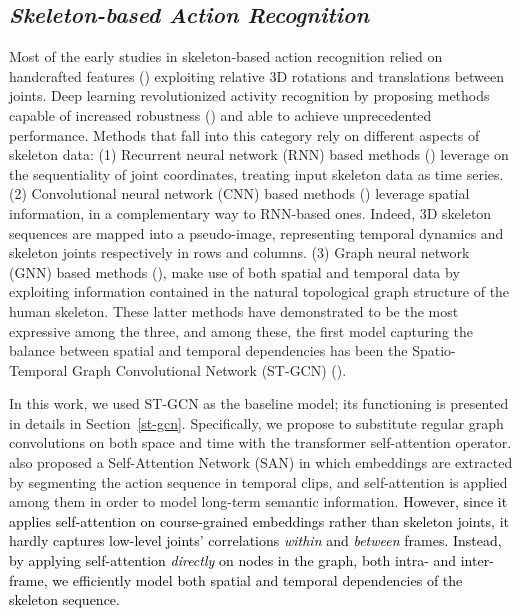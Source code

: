 \documentclass[times,twocolumn,final,authoryear]{elsarticle}
\DeclareRobustCommand{\new}[1]
{{\textcolor{black}{#1}}}
\begin{document}
\subsection{\textit{Skeleton-based Action Recognition}}{Most of the early studies in skeleton-based action recognition relied on handcrafted features (\cite{jointly,points,locations}) exploiting relative 3D rotations and translations between joints. Deep learning revolutionized activity recognition by proposing methods capable of increased robustness (\cite{a-comparative}) and able to achieve unprecedented performance. Methods that fall into this category rely on different aspects of skeleton data: (1) Recurrent neural network (RNN) based methods (\cite{Rnn,modeling,global-context,hrnn}) leverage on the sequentiality of joint coordinates, treating input skeleton data as time series. (2) Convolutional neural network (CNN) based methods (\cite{p-cnn,2s-cnn,investigation,liu2017enhanced,bo}) leverage spatial information, in a complementary way to RNN-based ones. Indeed, 3D skeleton sequences are mapped into a pseudo-image, representing temporal dynamics and skeleton joints respectively in rows and columns. (3) Graph neural network (GNN) based methods (\cite{yan2018spatial,li2019actional,Shi2018TwoStreamAG,dirgraph,shift,disent}), make use of both spatial and temporal data by exploiting information contained in the natural topological graph structure of the human skeleton. These latter methods have demonstrated to be the most expressive among the three, and among these, the first model capturing the balance between spatial and temporal dependencies has been the Spatio-Temporal Graph Convolutional Network (ST-GCN) (\cite{yan2018spatial}). 

In this work, we used ST-GCN as the baseline model; its functioning is presented in details in Section~\ref{st-gcn}. Specifically, we propose to substitute regular graph convolutions on both space and time with the transformer self-attention operator. \cite{san} also proposed a Self-Attention Network (SAN) in which embeddings are extracted by segmenting the action sequence in temporal clips, and self-attention is applied among them in order to model long-term semantic information. \new{However, since it applies self-attention on course-grained embeddings rather than skeleton joints, it hardly captures low-level joints' correlations \textit{within} and \textit{between} frames. Instead, by applying self-attention \textit{directly} on nodes in the graph, both intra- and inter-frame, we efficiently model both spatial and temporal dependencies of the skeleton sequence. } }
\end{document}
